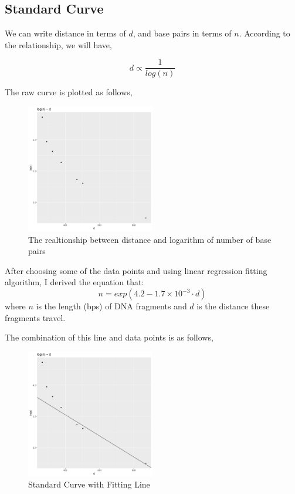 \documentclass{article}
\begin{document}
        \subsection{Standard Curve}

            We can write distance in terms of $d$, and base pairs in terms of $n$. According to the relationship, we will have,

            $$d \propto \frac{1}{log(n)}$$

            The raw curve is plotted as follows,
            \begin{figure}[H]
                \centering
                \includegraphics[width = 0.5\textwidth]{../Data/raw_point.png}
                \caption{The realtionship between distance and logarithm of number of base pairs}
                \label{raw.curve}
            \end{figure}

            After choosing some of the data points and using linear regression fitting algorithm, I derived the equation that:
            $$n = exp(4.2 - 1.7 \times 10 ^ {-3} \cdot d)$$
            where $n$ is the length (bps) of DNA fragments and $d$ is the distance these fragments travel.

            The combination of this line and data points is as follows,
            \begin{figure}[H]
                \centering
                \includegraphics[width = 0.5\textwidth]{../Data/raw_points_line.png}
                \caption{Standard Curve with Fitting Line}
                \label{raw.curve.line}
            \end{figure}
            
\end{document}
